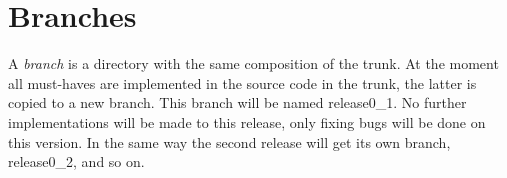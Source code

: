 \section{Branches}
A {\it branch} is a directory with the same composition of the trunk.
At the moment all must-haves are implemented in the source code in the trunk, the latter is copied to a new branch.
This branch will be named release0\_1.
No further implementations will be made to this release, only fixing bugs will be done on this version.
In the same way the second release will get its own branch, release0\_2, and so on.

